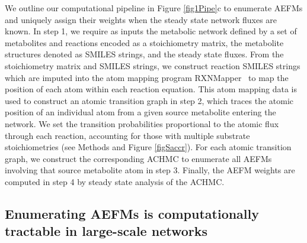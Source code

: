 \documentclass[12pt]{article}
\begin{document}
We outline our computational pipeline in Figure \ref{fig1Pipe}c to
enumerate AEFMs and uniquely assign their weights when the steady state
network fluxes are known. In step 1, we require as inputs the metabolic
network defined by a set of metabolites and reactions encoded as
a stoichiometry matrix, the metabolite structures denoted as SMILES
strings, and the steady state fluxes. From the stoichiometry matrix and
SMILES strings, we construct reaction SMILES strings which are imputed
into the atom mapping program RXNMapper~\citep{Schwaller2021extraction} to
map the position of each atom within each reaction equation. This atom
mapping data is used to construct an atomic transition graph in step 2,
which traces the atomic position of an individual atom from a given source
metabolite entering the network. We set the transition probabilities
proportional to the atomic flux through each reaction, accounting for
those with multiple substrate stoichiometries (see Methods and Figure
\ref{figSaccr}).
For each atomic transition graph, we construct the corresponding ACHMC to
enumerate all AEFMs involving that source metabolite atom in step 3.
Finally, the AEFM weights are computed in step 4 by steady state analysis
of the ACHMC. 

\subsection*{Enumerating AEFMs is computationally tractable in large-scale networks}
\end{document}
